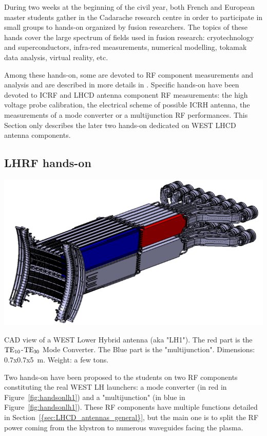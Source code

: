 During two weeks at the beginning of the civil year, both French and European master students gather in the Cadarache research centre in order to participate in small groups to hands-on organized by fusion researchers. The topics of these hands cover the large spectrum of fields used in fusion research: cryotechnology and superconductors, infra-red measurements, numerical modelling, tokamak data analysis, virtual reality, etc. 

Among these hands-on, some are devoted to RF component measurements and analysis and are described in more details in . Specific hands-on have been devoted to ICRF and LHCD antenna component RF measurements: the high voltage probe calibration, the electrical scheme of possible ICRH antenna, the measurements of a mode converter or a multijunction RF performances. This Section only describes the later two hands-on dedicated on WEST LHCD antenna components. 

\subsection{LHRF hands-on}

\begin{marginfigure}
	\centering
	\includegraphics[width=1.0\linewidth]{figures/chap5/handson_LH_1}
	\caption{CAD view of a WEST Lower Hybrid antenna (aka "LH1"). The red part is the ${\mathrm{TE}}_{10}$-${\mathrm{TE}}_{30}$ Mode Converter. The Blue part is the "multijunction". Dimensions: 0.7x0.7x5~m. Weight: a few tons. }
	\label{fig:handsonlh1}
\end{marginfigure}

Two hands-on have been proposed to the students on two RF components constituting the real WEST LH launchers: a mode converter (in red in Figure~\ref{fig:handsonlh1}) and a "multijunction" (in blue in Figure~\ref{fig:handsonlh1}). These RF components have multiple functions detailed in Section~\ref{{sec:LHCD_antennas_general}}, but the main one is to split the RF power coming from the klystron to numerous waveguides facing the plasma. 

